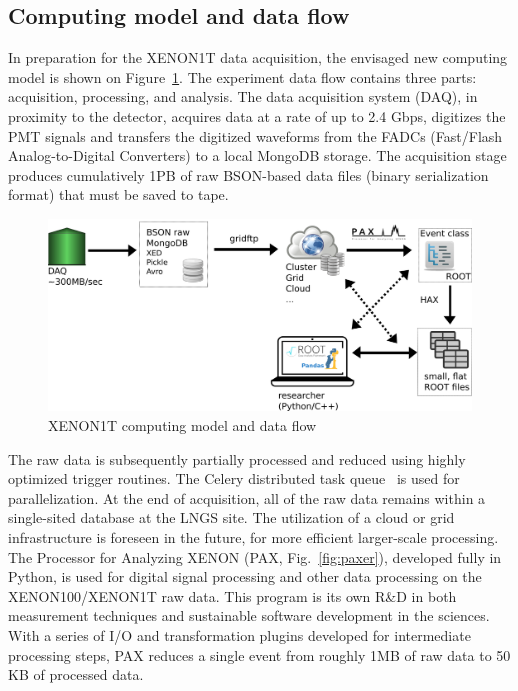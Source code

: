 \documentclass[a4paper]{jpconf}
\begin{document}
\subsection{Computing model and data flow}
In preparation for the XENON1T data acquisition, the envisaged new computing model is shown on Figure~\ref{fig:XENON1T_flow}.
The experiment data flow contains three parts: acquisition, processing, and analysis. 
The data acquisition system (DAQ), in proximity to the detector, acquires data at a rate of up to 2.4 Gbps, digitizes the PMT signals
and transfers the digitized waveforms from the FADCs (Fast/Flash Analog-to-Digital Converters)
to a local MongoDB storage. The acquisition stage produces cumulatively 1PB of raw BSON-based data
files (binary serialization format) that must be saved to tape.
\begin{figure}[!b]
 \centering
\begin{center}
\includegraphics[width=0.8\linewidth]{./graphics/XENON1T_flow1.png}
\caption{XENON1T computing model and data flow}
\label{fig:XENON1T_flow}
\end{center}
\end{figure}
The raw data is subsequently partially processed and reduced using highly optimized trigger routines.
The Celery distributed task queue~\cite{solem2014celery} is used for parallelization. 
At the end of
acquisition, all of the raw data remains within a single-sited database at the LNGS site. The utilization of a cloud or grid infrastructure is foreseen in the future, for more efficient larger-scale processing.
The Processor for Analyzing XENON (PAX, Fig.~\ref{fig:paxer}), developed fully in Python, is used for digital signal processing and other data processing on the XENON100/XENON1T raw data.
This program is its own R\&D in both measurement techniques and sustainable
software development in the sciences. With a series of I/O and transformation plugins developed for intermediate processing steps, PAX reduces a single event from roughly 1MB
of raw data to 50 KB of processed data. 
\end{document}
